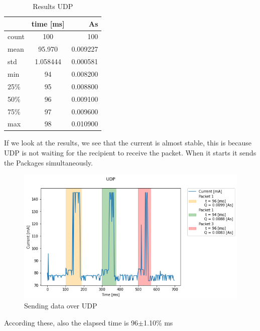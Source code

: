 \begin{table}[htbp]
\begin{center}
\caption{Results UDP}
\label{tab:table2}
\renewcommand{\arraystretch}{1.8}
\begin{tabular}{l|c|r}
& \textbf{time [ms]} & \textbf{As}\\
\hline
count & 100 & 100\\
mean & 95.970 & 0.009227\\
std & 1.058444 & 0.000581\\
min & 94 & 0.008200\\
25\% & 95 & 0.008800\\
50\% & 96 & 0.009100\\
75\% & 97 & 0.009600\\
max & 98 & 0.010900\\
\end{tabular}
\end{center}
\end{table}
\linebreak
If we look at the results, we see that the current is almost stable,
this is because UDP is not waiting for the recipient to receive the packet.
When it starts it sends the Packages simultaneously.\linebreak\linebreak
\begin{figure}[h!]
\centering
\includegraphics[width = 1 \linewidth]{fig/udp_tcp/udp_s_m.png}
\caption{Sending data over UDP}
\label{fig:udp_s_m}
\end{figure}
\linebreak\linebreak
According these, also the elapsed time is 96$\pm$1.10\% ms
\linebreak
